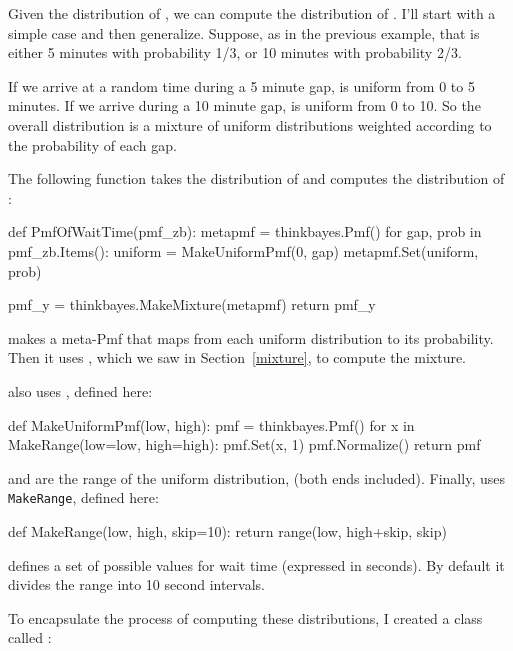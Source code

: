 \documentclass[12pt]{book}
\theoremstyle{exercise}
\begin{document}
Given the distribution of , we can compute the distribution of
.  I'll start with a simple case and then generalize.
Suppose, as in the previous example, that  is either 5 minutes
with probability 1/3, or 10 minutes with probability 2/3.

If we arrive at a random time during a 5 minute gap, 
 is uniform from 0 to 5 minutes.  If we arrive during a 10
minute gap,  is uniform from 0 to 10.  So the overall
distribution is a mixture of uniform distributions weighted
according to the probability of each gap.

The following function takes the distribution of  and
computes the distribution of :

\begin{code}
def PmfOfWaitTime(pmf_zb):
    metapmf = thinkbayes.Pmf()
    for gap, prob in pmf_zb.Items():
        uniform = MakeUniformPmf(0, gap)
        metapmf.Set(uniform, prob)

    pmf_y = thinkbayes.MakeMixture(metapmf)
    return pmf_y
\end{code}

 makes a meta-Pmf that maps from each uniform
distribution to its probability.  Then it uses ,
which we saw in Section~\ref{mixture}, to compute the mixture.

 also uses , defined here:

\begin{code}
def MakeUniformPmf(low, high):
    pmf = thinkbayes.Pmf()
    for x in MakeRange(low=low, high=high):
        pmf.Set(x, 1)
    pmf.Normalize()
    return pmf
\end{code}

 and  are the range of the uniform distribution,
(both ends included).  Finally,  uses {\tt
  MakeRange}, defined here:

\begin{code}
def MakeRange(low, high, skip=10):
    return range(low, high+skip, skip)
\end{code}

 defines a set of possible values for wait time
(expressed in seconds).  By default it divides the range into 
10 second intervals.

To encapsulate the process of computing these distributions, I
created a class called :
\end{document}
